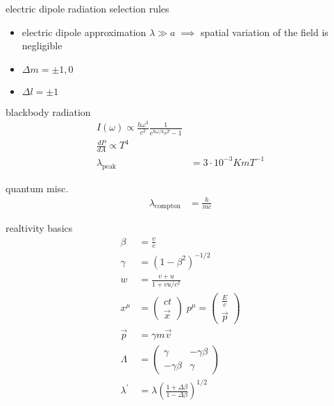 \documentclass[avery5388, frame, grid]{flashcards}
\begin{document}
\begin{flashcard}{electric dipole radiation selection rules}
  {
    \begin{itemize}
    \item electric dipole approximation $\lambda \gg a \; \implies$ spatial variation of the field is negligible
    \item $\Delta m = \pm 1, 0$
    \item $\Delta l = \pm 1$
    \end{itemize}
  }
\end{flashcard}

\begin{flashcard}{blackbody radiation}
  {
    \begin{align*}
      I(\omega) \propto \frac{h \omega^{3}}{c^{2}} \frac{1}{e^{\hbar \omega / k_{B} T} - 1}\\
      \frac{dP}{dA} \propto T^{4}\\
      \lambda_{\textrm{peak}} &= 3 \cdot 10^{-3} K m T^{-1}
    \end{align*}
  }
\end{flashcard}

\begin{flashcard}{quantum misc.}
  {
    \begin{align*}
      \lambda_{\textrm{compton}} &= \frac{h}{mc}
    \end{align*}
  }
\end{flashcard}


\begin{flashcard}{realtivity basics}
  {
    \begin{align*}
      \beta &= \frac{v}{c}\\
      \gamma &= (1 - \beta^{2})^{-1/2}\\
      w &= \frac{v + u}{1 + vu/c^{2}}\\
      x^{\mu} &= \begin{pmatrix} ct\\ \vec{x} \end{pmatrix} \; p^{\mu} = \begin{pmatrix} \frac{E}{c}\\ \vec{p} \end{pmatrix}\\
      \vec{p} &= \gamma m \vec{v}\\
      \Lambda &= \begin{pmatrix} \gamma & -\gamma \beta\\ -\gamma \beta & \gamma \end{pmatrix}\\
      \lambda^{'} &= \lambda (\frac{1 + \Delta \beta}{1 - \Delta \beta})^{1/2}
    \end{align*}
  }
\end{flashcard}
\end{document}

